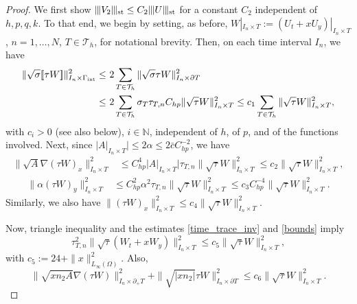 \documentclass{amsart}
\newcommand{\norm}[2]{\|{#1}\|_{{#2}}}
\newcommand{\jump}[1]{[\kern-0.6mm [{#1}]\kern-0.6mm]}
\newcommand{\su}{\sum_{T \in \Th}}
\newcommand{\Th}{\mathcal{T}_h}
\newcommand{\gint}{\Gamma_{\rm int}}
\newcommand{\ndg}[1]{|\kern-.03cm \|{#1}|\kern-.03cm \|}
\newcommand{\chp}{C_{hp}}
\newcommand{\normal}{{n}}
\theoremstyle{definition}
\theoremstyle{remark}
\numberwithin{equation}{section}
\begin{document}
\begin{proof}
We first show $\ndg{V_2 }_{\rm st}\leq C_2 \ndg{U}_{\rm st}$ for a constant $C_2$ independent of $h,p,q,k$. To that end,  we begin by setting, as before, $W|_{I_n\times T}:=(U_t+xU_y)|_{I_n\times T}$, $n=1,\dots,N$, $T\in\Th$, for notational brevity. Then, on each time interval  $I_n$, we have
\begin{equation*}\begin{split}
		 \norm{\sqrt{\sigma} \jump{\tau W}}{I_n\times \gint }^2
		 \leq &\
		2  \su \norm{\sqrt{\sigma} {\tau W}}{I_n\times \partial T }^2
		\\
	\leq &\
		2  \su \sigma_T \tau_{T,n} \chp\norm{ \sqrt{\tau} W}{I_n\times  T }^2
	\le
		c_1 \su \norm{ \sqrt{\tau} W}{I_n\times  T }^2 ,
\end{split}\end{equation*}
 with  $c_i>0$ (see also below), $i\in\mathbb{N}$, independent of $h$, of $p$, and of the functions involved.
Next, since $|A|_{I_n\times T}|\leq 2\alpha \le2\bar{c}\chp^{-2}$, we have
\begin{equation*}\begin{split}
	  \norm{\sqrt{A}\nabla (\tau W )_x}{I_n\times T}^2
		&\leq
	 \chp^4 |A|_{I_n\times T}| \tau_{T,n}  \norm{ \sqrt{\tau}W}{I_n\times T}^2
		\leq  c_2  \norm{\sqrt{\tau}W}{I_n\times T }^2,
\end{split}\end{equation*}
\begin{equation*}\begin{split}
	\norm{\alpha (\tau W)_y}{I_n\times T}^2
		&\leq  \chp^2 \alpha^2 \tau_{T,n}  \norm{ \sqrt{\tau} W}{I_n\times T}^2  \le c_3 \chp^{-4}\norm{\sqrt{\tau} W}{ I_n\times T }^2 .
\end{split}\end{equation*}
Similarly, we also have $\norm{(\tau W)_x}{I_n\times T}^2
 \leq
c_4\norm{ \sqrt{\tau} W}{I_n\times T}^2$.

Now, triangle inequality and the estimates \eqref{time_trace_inv} and \eqref{bounds} imply
\begin{equation*}
		   \tau_{T,n}^2 \norm{ \sqrt{\tau}(W_t + xW_y) }{I_n\times T}^2
		\leq c_5
	 \norm{ \sqrt{\tau}W  }{I_n\times T}^2,
\end{equation*}
with $c_5:= 24+
\norm{x}{L_\infty(\Omega)}^2$.
Also,
\begin{equation*}
		     \norm{ \sqrt{x\normal_2 A}\nabla (\tau W) }{I_n\times \partial_+ T}^2 +	 \norm{ \sqrt{|x\normal_2|} \tau W}{I_n\times \partial T }^2
		\leq
	c_6  \norm{ \sqrt{\tau}W }{I_n\times  T}^2.
	  \end{equation*}


\end{proof}
\end{document}
